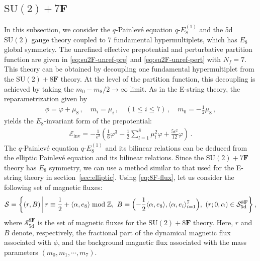 \documentclass[11pt, a4paper]{article}
\theoremstyle{definition}
\begin{document}
\subsection{\texorpdfstring{$ \mathrm{SU}(2) + 7\mathbf{F} $}{SU(2) + 7F}} \label{sec:7F}

In this subsection, we consider the $ q $-Painlev\'e equation $ q\text{-}E_8^{(1)} $ and the 5d $ \mathrm{SU}(2) $ gauge theory coupled to 7 fundamental hypermultiplets, which has $ E_8 $ global symmetry. The unrefined effective prepotential and perturbative partition function are given in \eqref{eq:su2F-unref-pre} and \eqref{eq:su2F-unref-pert} with $ N_f=7 $. This theory can be obtained by decoupling one fundamental hypermultiplet from the $ \mathrm{SU}(2)+8\mathbf{F} $ theory. At the level of the partition function, this decoupling is achieved by taking the $ m_0 - m_8/2 \to \infty $ limit. As in the E-string theory, the reparametrization given by
\begin{align}
    \phi = \varphi + \mu_8 \, , \quad
    m_i = \mu_i \, , \quad (1 \leq i \leq 7) \, , \quad
    m_0 = -\frac{1}{2}\mu_8 \, ,
\end{align}
yields the $ E_8 $-invariant form of the prepotential:
\begin{align}
    \mathcal{E}_{\mathrm{inv}} = -\frac{1}{\epsilon^2} \left( \frac{1}{6}\varphi^3 - \frac{1}{2} \sum_{l=1}^8 \mu_l^2 \varphi + \frac{5\epsilon^2}{12}\varphi \right) \, .
\end{align}
The $ q $-Painlev\'e equation $ q\text{-}E_8^{(1)} $ and its bilinear relations can be deduced from the elliptic Painlev\'e equation and its bilinear relations. Since the $ \mathrm{SU}(2)+7\mathbf{F} $ theory has $ E_8 $ symmetry, we can use a method similar to that used for the E-string theory in section~\ref{sec:elliptic}. Using \eqref{eq:8F-flux}, let us consider the following set of magnetic fluxes:
\begin{align}
    \mathcal{S} = \left\{ (r,B) \, \bigg| \, r \equiv \frac{1}{2} + \langle \alpha, e_8 \rangle \bmod{\mathbb{Z}} , \ B = \Bigl(-\frac{1}{2} \langle \alpha, e_8 \rangle, \langle \alpha, e_i \rangle_{i=1}^7\Bigr) , \ (r;0,\alpha) \in \mathcal{S}_{\mathrm{5d}}^{8\mathbf{F}} \right\} ,
\end{align}
where $ \mathcal{S}_{\mathrm{5d}}^{8\mathbf{F}} $ is the set of magnetic fluxes for the $ \mathrm{SU}(2)+8\mathbf{F} $ theory. Here, $ r $ and $ B $ denote, respectively, the fractional part of the dynamical magnetic flux associated with $ \phi $, and the background magnetic flux associated with the mass parameters $ (m_0,m_1,\cdots,m_7) $.
\end{document}
